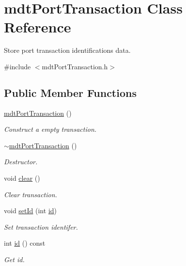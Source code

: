 \hypertarget{classmdt_port_transaction}{\section{mdt\-Port\-Transaction Class Reference}
\label{classmdt_port_transaction}
}


Store port transaction identifications data.  




{\ttfamily \#include $<$mdt\-Port\-Transaction.\-h$>$}

\subsection*{Public Member Functions}
\begin{DoxyCompactItemize}
\item 
\hyperlink{classmdt_port_transaction_ad1ad236620299408bb3c5b6f573ea6ba}{mdt\-Port\-Transaction} ()
\begin{DoxyCompactList}\small\item\em Construct a empty transaction. \end{DoxyCompactList}\item 
\hyperlink{classmdt_port_transaction_ae20476e75c2ab1997ddfb82c1bac5549}{$\sim$mdt\-Port\-Transaction} ()
\begin{DoxyCompactList}\small\item\em Destructor. \end{DoxyCompactList}\item 
void \hyperlink{classmdt_port_transaction_a5f7b04df58291d52e61c5bd1b7f7bb7f}{clear} ()
\begin{DoxyCompactList}\small\item\em Clear transaction. \end{DoxyCompactList}\item 
void \hyperlink{classmdt_port_transaction_a3f0ff197ba4b58f0dd206e6151109fde}{set\-Id} (int \hyperlink{classmdt_port_transaction_ae68abafb0501c98f85147adc176d8d83}{id})
\begin{DoxyCompactList}\small\item\em Set transaction identifer. \end{DoxyCompactList}\item 
int \hyperlink{classmdt_port_transaction_ae68abafb0501c98f85147adc176d8d83}{id} () const 
\begin{DoxyCompactList}\small\item\em Get id. \end{DoxyCompactList}\item 

\end{DoxyCompactItemize}
